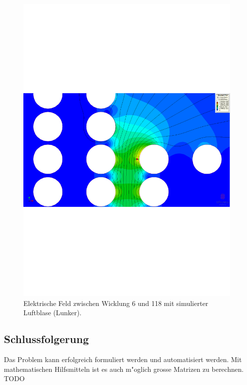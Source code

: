 \begin{refsection}
\begin{figure}
	\centering
	\includegraphics[width=\textwidth]{./trafo/images/VoltageTrans_bubble_turn6_10u_9u.pdf}
	\caption{Elektrische Feld zwischen Wicklung 6 und 118 mit simulierter Luftblase (Lunker).}
	\label{trafo:E-FieldBubble}
\end{figure}

\subsection{Schlussfolgerung}
Das Problem kann erfolgreich formuliert werden und automatisiert werden. Mit mathematischen Hilfsmitteln ist es auch m"oglich grosse Matrizen zu berechnen. \color{red} TODO

\printbibliography[heading=subbibliography]
\end{refsection}
